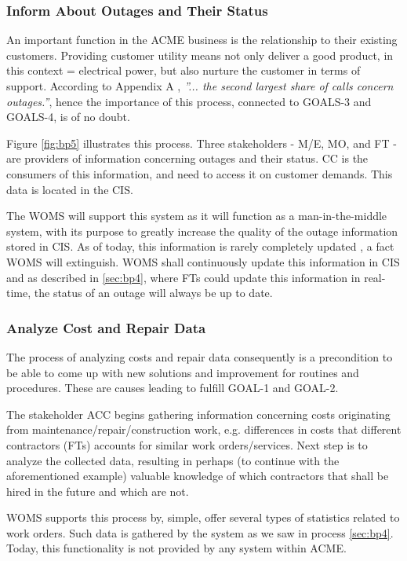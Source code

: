 \subsubsection{Inform About Outages and Their Status}
\label{bp5}
An important function in the ACME business is the relationship to their existing customers. Providing customer utility means not only deliver a good product, in this context = electrical power, but also nurture the customer in terms of support. According to Appendix A \cite{appendixA}, \emph{''... the second largest share of calls concern outages.''}, hence the importance of this process, connected to GOALS-3 and GOALS-4, is of no doubt. 

Figure \ref{fig:bp5} illustrates this process. Three stakeholders - M/E, MO, and FT - are providers of information concerning outages and their status. CC is the consumers of this information, and need to access it on customer demands. This data is located in the CIS.

The WOMS will support this system as it will function as a man-in-the-middle system, with its purpose to greatly increase the quality of the outage information stored in CIS. As of today, this information is rarely completely updated \cite{appendixA}, a fact WOMS will extinguish. WOMS shall continuously update this information in CIS and as described in \ref{sec:bp4}, where FTs could update this information in real-time, the status of an outage will always be up to date. 

\subsubsection{Analyze Cost and Repair Data}
\label{bp6}
The process of analyzing costs and repair data consequently is a precondition to be able to come up with new solutions and improvement for routines and procedures. These are causes leading to fulfill GOAL-1 and GOAL-2. 

The stakeholder ACC begins gathering information concerning costs originating from maintenance/repair/construction work, e.g. differences in costs that different contractors (FTs) accounts for similar work orders/services.  Next step is to analyze the collected data, resulting in perhaps (to continue with the aforementioned example) valuable knowledge of which contractors that shall be hired in the future and which are not. 

WOMS supports this process by, simple, offer several types of statistics related to work orders. Such data is gathered by the system as we saw in process \ref{sec:bp4}. Today, this functionality is not provided by any system within ACME.
